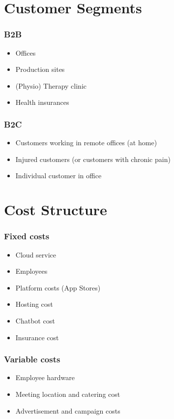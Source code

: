 \section{Customer Segments}
\subsubsection*{B2B}
\begin{itemize}
    \item Offices
    \item Production sites
    \item (Physio) Therapy clinic
    \item Health insurances
\end{itemize}

\subsubsection*{B2C}
\begin{itemize}
    \item Customers working in remote offices (at home)
    \item Injured customers (or customers with chronic pain)
    \item Individual customer in office
\end{itemize}

\section{Cost Structure}
\subsubsection*{Fixed costs}
\begin{itemize}
    \item Cloud service
    \item Employees
    \item Platform costs (App Stores)
    \item Hosting cost
    \item Chatbot cost
    \item Insurance cost
\end{itemize}

\subsubsection*{Variable costs}
\begin{itemize}
    \item Employee hardware
    \item Meeting location and catering cost
    \item Advertisement and campaign costs
\end{itemize}

